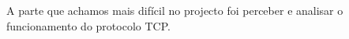 \documentclass[11pt,a4paper,reqno]{report}
\numberwithin{equation}{section}
\begin{document}
A parte que achamos mais difícil no projecto foi perceber e analisar o funcionamento do protocolo TCP.



\end{document}
